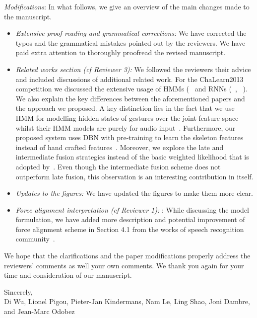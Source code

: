\documentclass[12pt]{article}
\begin{document}
{\noindent \em Modifications}: In what follows, we give an overview of the main changes made to the manuscript. 

\begin{itemize}
\item {\em Extensive proof reading and grammatical corrections:} We have corrected the typos and the grammatical mistakes pointed out by the reviewers. We have paid extra attention to thoroughly proofread the revised manuscript. 

\item {\em Related works section (cf Reviewer 3):} We followed  the reviewers their advice and included discussions of additional related work. For the ChaLearn2013 competition we discussed the extensive usage of HMMs (~\cite{nandakumar2013multi, wu2013fusing} and RNNs (~\cite{neverova2013multi}, ~\cite{wu2013fusing, socher2012convolutional}). We also explain the key differences between the aforementioned papers and the approach we proposed. A key distinction lies in the fact that we use HMM for modelling hidden states of gestures over the joint feature space whilst their HMM models are purely for audio input~\cite{nandakumar2013multi,wu2013fusing}. Furthermore, our proposed system uses DBN with pre-training to learn the skeleton features instead of hand crafted features~\cite{neverova2013multi}. Moreover, we explore the late and intermediate fusion strategies instead of the basic weighted likelihood that is adopted by~\cite{nandakumar2013multi}. Even though the intermediate fusion scheme does not outperform late fusion, this observation is an interesting contribution in itself.
\item {\em Updates to the figures:} We have updated the figures to make them more clear.
 \item {\em Force alignment interpretation (cf Reviewer 1): }: While discussing the model formulation, we have added more description and potential improvement of force alignment scheme in Section 4.1 from the works of speech recognition community~\cite{yu2012automatic}.
\end{itemize}
We hope that the clarifications and the paper modifications properly address the reviewers' comments as well your own comments. We thank you again for your time and consideration of our manuscript.


\noindent Sincerely,\\[3mm]
Di Wu, Lionel Pigou, Pieter-Jan Kindermans, Nam Le, Ling Shao, Joni Dambre, and Jean-Marc Odobez



\end{document}
